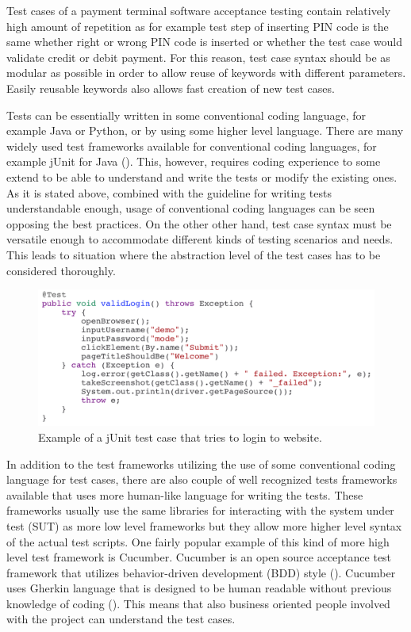 Test cases of a payment terminal software acceptance testing contain relatively high amount of repetition as for example test step of inserting PIN code is the same whether right or wrong PIN code is inserted or whether the test case would validate credit or debit payment. For this reason, test case syntax should be as modular as possible in order to allow reuse of keywords with different parameters. Easily reusable keywords also allows fast creation of new test cases.

Tests can be essentially written in some conventional coding language, for example Java or Python, or by using some higher level language. There are many widely used test frameworks available for conventional coding languages, for example jUnit for Java (\emph{\cite{junit}}). This, however, requires coding experience to some extend to be able to understand and write the tests or modify the existing ones. As it is stated above, combined with the guideline for writing tests understandable enough, usage of conventional coding languages can be seen opposing the best practices. On the other other hand, test case syntax must be versatile enough to accommodate different kinds of testing scenarios and needs. This leads to situation where the abstraction level of the test cases has to be considered thoroughly.

\begin{figure}[ht]
  \begin{center}
    \includegraphics[width=13cm]{images/junit_example.png}
    \caption{Example of a jUnit test case that tries to login to website.}
    \label{fig:junit}
  \end{center}
\end{figure}
\FloatBarrier

In addition to the test frameworks utilizing the use of some conventional coding language for test cases, there are also couple of well recognized tests frameworks available that uses more human-like language for writing the tests. These frameworks usually use the same libraries for interacting with the system under test (SUT) as more low level frameworks but they allow more higher level syntax of the actual test scripts. One fairly popular example of this kind of more high level test framework is Cucumber. Cucumber is an open source acceptance test framework that utilizes behavior-driven development (BDD) style (\emph{\cite{cucumber}}). Cucumber uses Gherkin language that is designed to be human readable without previous knowledge of coding (\emph{\cite{gherkin}}). This means that also business oriented people involved with the project can understand the test cases.

